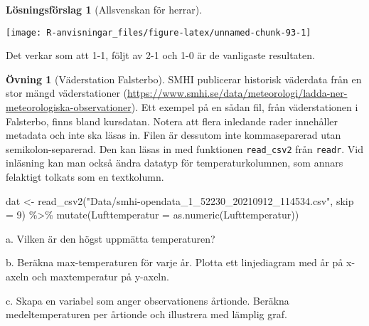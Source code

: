 \documentclass[
]{book}
\newenvironment{Shaded}{\begin{snugshade}}{\end{snugshade}}
\newcommand{\AttributeTok}[1]{\textcolor[rgb]{0.77,0.63,0.00}{#1}}
\newcommand{\DecValTok}[1]{\textcolor[rgb]{0.00,0.00,0.81}{#1}}
\newcommand{\FunctionTok}[1]{\textcolor[rgb]{0.00,0.00,0.00}{#1}}
\newcommand{\NormalTok}[1]{#1}
\newcommand{\OtherTok}[1]{\textcolor[rgb]{0.56,0.35,0.01}{#1}}
\newcommand{\SpecialCharTok}[1]{\textcolor[rgb]{0.00,0.00,0.00}{#1}}
\newcommand{\StringTok}[1]{\textcolor[rgb]{0.31,0.60,0.02}{#1}}
\theoremstyle{definition}
\theoremstyle{definition}
\theoremstyle{definition}
\newtheorem{exercise}{Övning}[chapter]
\theoremstyle{definition}
\newtheorem{hypothesis}{Lösningsförslag}[chapter]
\theoremstyle{remark}
\begin{document}
\begin{hypothesis}[Allsvenskan för herrar]
\begin{center}\texttt{[image: R-anvisningar\_files/figure-latex/unnamed-chunk-93-1]} \end{center}

Det verkar som att 1-1, följt av 2-1 och 1-0 är de vanligaste resultaten.
\end{hypothesis}

\begin{exercise}[Väderstation Falsterbo]
SMHI publicerar historisk väderdata från en stor mängd väderstationer (\url{https://www.smhi.se/data/meteorologi/ladda-ner-meteorologiska-observationer}). Ett exempel på en sådan fil, från väderstationen i Falsterbo, finns bland kursdatan. Notera att flera inledande rader innehåller metadata och inte ska läsas in. Filen är dessutom inte kommaseparerad utan semikolon-separerad. Den kan läsas in med funktionen \texttt{read\_csv2} från \texttt{readr}. Vid inläsning kan man också ändra datatyp för temperaturkolumnen, som annars felaktigt tolkats som en textkolumn.

\begin{Shaded}
\begin{Highlighting}[]
\NormalTok{dat }\OtherTok{\textless{}{-}} \FunctionTok{read\_csv2}\NormalTok{(}\StringTok{"Data/smhi{-}opendata\_1\_52230\_20210912\_114534.csv"}\NormalTok{, }\AttributeTok{skip =} \DecValTok{9}\NormalTok{) }\SpecialCharTok{\%\textgreater{}\%} 
  \FunctionTok{mutate}\NormalTok{(}\AttributeTok{Lufttemperatur =} \FunctionTok{as.numeric}\NormalTok{(Lufttemperatur))}
\end{Highlighting}
\end{Shaded}

a. Vilken är den högst uppmätta temperaturen?

b. Beräkna max-temperaturen för varje år. Plotta ett linjediagram med år på x-axeln och maxtemperatur på y-axeln.

c. Skapa en variabel som anger observationens årtionde. Beräkna medeltemperaturen per årtionde och illustrera med lämplig graf.
\end{exercise}
\end{document}
